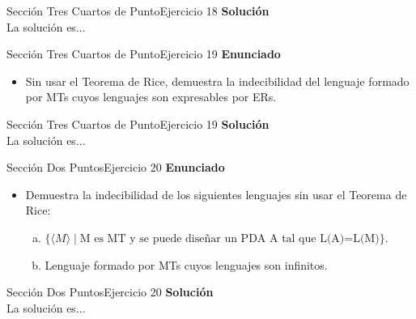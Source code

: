 \documentclass[10pt, envcountsect, presentation, aspectratio=169]{beamer}
\begin{document}

\begin{frame}{Sección Tres Cuartos de Punto}{Ejercicio 18}
    \textbf{Solución}\\
    La solución es...
\end{frame}


\begin{frame}{Sección Tres Cuartos de Punto}{Ejercicio 19}
    \textbf{Enunciado}
    \begin{itemize}
        \item Sin usar el Teorema de Rice, demuestra la indecibilidad del lenguaje formado por MTs cuyos lenguajes son expresables por ERs.
    \end{itemize}
\end{frame}


\begin{frame}{Sección Tres Cuartos de Punto}{Ejercicio 19}
    \textbf{Solución}\\
    La solución es...
\end{frame}


\begin{frame}{Sección Dos Puntos}{Ejercicio 20}
    \textbf{Enunciado}
    \begin{itemize}
        \item Demuestra la indecibilidad de los siguientes lenguajes sin usar el Teorema de Rice:
        \begin{enumerate}[a)]
            \item $\{\langle M \rangle \mid \mbox{M es MT y  se puede diseñar  un PDA A tal que L(A)=L(M)}\}$.
            \item Lenguaje formado por MTs  cuyos lenguajes son infinitos.
        \end{enumerate}
    \end{itemize}
\end{frame}


\begin{frame}{Sección Dos Puntos}{Ejercicio 20}
    \textbf{Solución}\\
    La solución es...
\end{frame}
\end{document}

